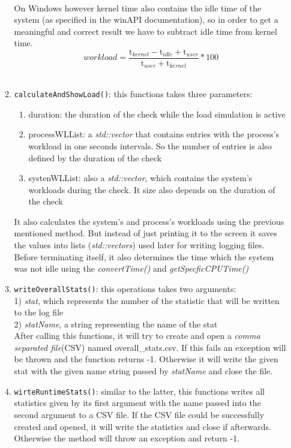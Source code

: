 \begin{enumerate}
\begin{enumerate}
\begin{equation}
		\end{equation}\\
		On Windows however kernel time also contains the idle time of the system (as specified in the winAPI documentation), so in order to get a meaningful and correct result we have to subtract idle time from kernel time.
		\begin{equation}
		workload =  \frac{\mathrm{t}_{kernel}-\mathrm{t}_{idle}+\mathrm{t}_{user}}{\mathrm{t}_{user}+\mathrm{t}_{kernel}}*100
		\end{equation}\\
		\item \texttt{calculateAndShowLoad()}: this functions takes three parameters:
		\begin{enumerate}
			\item duration: the duration of the check while the load simulation is active
			\item processWLList: a \textit{std::vector} that contains entries with the process's workload in one seconds intervals. So the number of entries is also defined by the duration of the check
			\item systenWLList: also a \textit{std::vector}, which contains the system's workloads during the check. It size also depends on the duration of the check 
		\end{enumerate}
		It also calculates the system's and process's workloads using the previous mentioned method. But instead of just printing it to the screen it saves the values into lists (\textit{std::vectors}) used later for writing logging files. Before terminating itself, it also determines the time which the system was not idle using the \textit{convertTime()} and \textit{getSpecficCPUTime()}
		\item \texttt{writeOverallStats()}: this operations takes two arguments:\\
		1) \textit{stat}, which represents the number of the statistic that will be written to the log file\\
		2) \textit{statName}, a string representing the name of the stat\\
		After calling this functions, it will try to create and open a \textit{comma separated file}(CSV) named \dq overall\_stats.csv\dq{}. If this fails an exception will be thrown and the function returns -1. Otherwise it will write the given stat with the given name string passed by \textit{statName} and close the file.
		\item \texttt{wirteRuntimeStats()}: similar to the latter, this functions writes all statistics given by its first argument with the name passed into the second argument to a CSV file. If the CSV file could be successfully created and opened, it will write the statistics and close if afterwards. Otherwise the method will throw an exception and return -1.
	\end{enumerate}
\end{enumerate}
